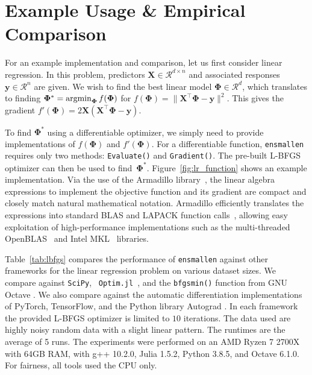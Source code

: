 \documentclass[twoside,11pt]{article}
\begin{document}
\section{Example Usage \& Empirical Comparison}

For an example implementation and comparison, let us first consider linear regression.
In this problem, predictors $\bm X \in \mathcal{R}^{d \times n}$
and associated responses $\bm y \in \mathcal{R}^n$ are given.
We wish to find the best linear model $\bm \Phi \in \mathcal{R}^d$,
which translates to finding
$\bm \Phi^* = \operatornamewithlimits{argmin}_{\bm\Phi} f(\bm \Phi)$ for
$f(\bm \Phi) = \| \bm X^{\top} \bm \Phi - \bm y \|^2.$
This gives the gradient
$f'(\bm \Phi) = 2 \bm X (\bm X^{\top} \bm \Phi - \bm y).$

To find $\bm \Phi^*$ using a differentiable optimizer,
we simply need to provide implementations of $f(\bm \Phi)$ and $f'(\bm \Phi)$.
For a differentiable function, {\tt ensmallen} requires only two methods:
{\tt Evaluate()} and {\tt Gradient()}.
The pre-built L-BFGS optimizer can then be used to find~$\bm \Phi^*$.
Figure~\ref{fig:lr_function} shows an example implementation.
Via the use of the Armadillo library~\citep{sanderson2016armadillo},
the linear algebra expressions to implement the objective function and its gradient
are compact and closely match natural mathematical notation.
Armadillo efficiently translates the expressions into standard BLAS and LAPACK function calls~\citep{anderson1999lapack},
allowing easy exploitation of high-performance implementations such as the multi-threaded \mbox{OpenBLAS}~\citep{OpenBLAS} and Intel MKL~\citep{IntelMKL} libraries.

Table~\ref{tab:lbfgs} compares the performance
of {\tt ensmallen} against other frameworks
for the linear regression problem on various dataset sizes.
We compare against {\tt SciPy}, {\tt
Optim.jl}~\citep{mogensen2018optim}, and the {\tt bfgsmin()} function from GNU
Octave \citep{octave}.
We also compare against the automatic differentiation implementations of
PyTorch, TensorFlow,
and the Python library Autograd \citep{maclaurin2015autograd}.
In each framework the provided L-BFGS optimizer is limited to $10$ iterations.
The data used are highly noisy random data with a slight linear pattern.
The runtimes are the average of 5 runs.
The experiments were performed on an AMD Ryzen 7 2700X with 64GB RAM,
with g++ 10.2.0, Julia 1.5.2, Python 3.8.5, and Octave 6.1.0.
For fairness, all tools used the CPU only.
\end{document}
